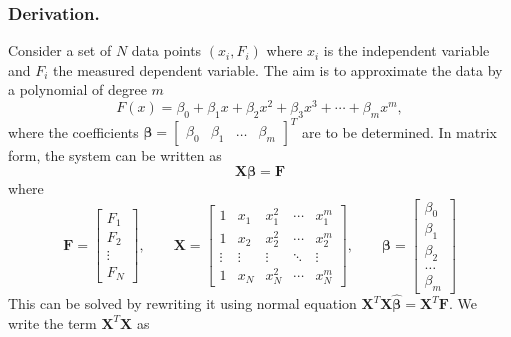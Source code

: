 \documentclass[../../../main.tex]{subfiles}
\begin{document}
\subsubsection{Derivation.}
Consider a set of $N$ data points $(x_i,F_i)$ where $x_i$ is the independent variable and $F_i$ the measured dependent variable.
The aim is to approximate the data by a polynomial of degree $m$
\begin{equation*}
    F(x) = \beta_0 + \beta_1 x + \beta_2 x^2 + \beta_3 x^3 + \cdots + \beta_m x^m,
\end{equation*}
where the coefficients \(\boldsymbol{\beta} =\begin{bmatrix}
    \beta_0 & \beta_1 & \ldots & \beta_m
\end{bmatrix}^{T}\) are to be determined.
In matrix form, the system can be written as
\begin{equation*}
    \mathbf{X}\boldsymbol{\beta}=\mathbf{F}
\end{equation*}
where
\begin{equation*}
    \mathbf{F} =
    \begin{bmatrix}
        F_1 \\ F_2 \\ \vdots \\ F_N
    \end{bmatrix},
    \qquad
    \mathbf{X} =
    \begin{bmatrix}
        1      & x_1    & x_1^2  & \cdots & x_1^m  \\
        1      & x_2    & x_2^2  & \cdots & x_2^m  \\
        \vdots & \vdots & \vdots & \ddots & \vdots \\
        1      & x_N    & x_N^2  & \cdots & x_N^m
    \end{bmatrix},
    \qquad
    \boldsymbol{\beta} =\begin{bmatrix}
        \beta_0 \\ \beta_1 \\ \beta_2\\ \ldots \\ \beta_m
    \end{bmatrix}
\end{equation*}
This can be solved by rewriting it using normal equation $    \mathbf{X}^{T}\mathbf{X}\hat{\boldsymbol{\beta}} = \mathbf{X}^{T}\mathbf{F}$.
We write the term $    \mathbf{X}^{T}\mathbf{X}$ as
\end{document}
